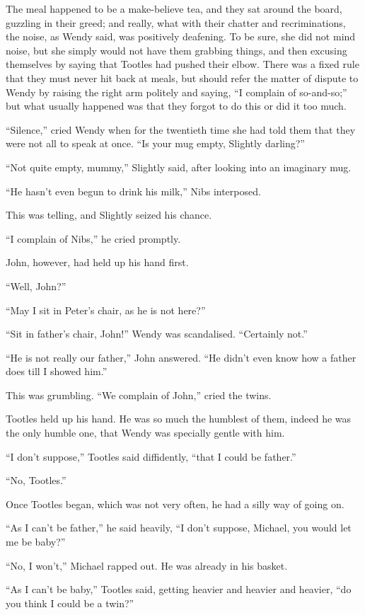 The meal happened to be a make-believe tea, and they sat around the
board, guzzling in their greed; and really, what with their chatter and
recriminations, the noise, as Wendy said, was positively deafening. To
be sure, she did not mind noise, but she simply would not have them
grabbing things, and then excusing themselves by saying that Tootles
had pushed their elbow. There was a fixed rule that they must never hit
back at meals, but should refer the matter of dispute to Wendy by
raising the right arm politely and saying, ``I complain of so-and-so;''
but what usually happened was that they forgot to do this or did it too
much.

``Silence,'' cried Wendy when for the twentieth time she had told them
that they were not all to speak at once. ``Is your mug empty, Slightly
darling?''

``Not quite empty, mummy,'' Slightly said, after looking into an
imaginary mug.

``He hasn't even begun to drink his milk,'' Nibs interposed.

This was telling, and Slightly seized his chance.

``I complain of Nibs,'' he cried promptly.

John, however, had held up his hand first.

``Well, John?''

``May I sit in Peter's chair, as he is not here?''

``Sit in father's chair, John!'' Wendy was scandalised. ``Certainly not.''

``He is not really our father,'' John answered. ``He didn't even know how
a father does till I showed him.''

This was grumbling. ``We complain of John,'' cried the twins.

Tootles held up his hand. He was so much the humblest of them, indeed
he was the only humble one, that Wendy was specially gentle with him.

``I don't suppose,'' Tootles said diffidently, ``that I could be father.''

``No, Tootles.''

Once Tootles began, which was not very often, he had a silly way of
going on.

``As I can't be father,'' he said heavily, ``I don't suppose, Michael, you
would let me be baby?''

``No, I won't,'' Michael rapped out. He was already in his basket.

``As I can't be baby,'' Tootles said, getting heavier and heavier and
heavier, ``do you think I could be a twin?''

